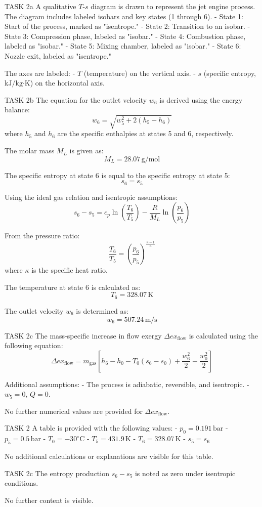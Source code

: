 TASK 2a  
A qualitative \( T \)-\( s \) diagram is drawn to represent the jet engine process. The diagram includes labeled isobars and key states (1 through 6).  
- State 1: Start of the process, marked as "isentrope."  
- State 2: Transition to an isobar.  
- State 3: Compression phase, labeled as "isobar."  
- State 4: Combustion phase, labeled as "isobar."  
- State 5: Mixing chamber, labeled as "isobar."  
- State 6: Nozzle exit, labeled as "isentrope."  

The axes are labeled:  
- \( T \) (temperature) on the vertical axis.  
- \( s \) (specific entropy, \( \text{kJ/kg·K} \)) on the horizontal axis.  

TASK 2b  
The equation for the outlet velocity \( w_6 \) is derived using the energy balance:  
\[
w_6 = \sqrt{w_5^2 + 2(h_5 - h_6)}
\]  
where \( h_5 \) and \( h_6 \) are the specific enthalpies at states 5 and 6, respectively.  

The molar mass \( M_L \) is given as:  
\[
M_L = 28.07 \, \text{g/mol}
\]  

The specific entropy at state 6 is equal to the specific entropy at state 5:  
\[
s_6 = s_5
\]  

Using the ideal gas relation and isentropic assumptions:  
\[
s_6 - s_5 = c_p \ln \left( \frac{T_6}{T_5} \right) - \frac{R}{M_L} \ln \left( \frac{p_6}{p_5} \right)
\]  

From the pressure ratio:  
\[
\frac{T_6}{T_5} = \left( \frac{p_6}{p_5} \right)^{\frac{\kappa - 1}{\kappa}}
\]  
where \( \kappa \) is the specific heat ratio.  

The temperature at state 6 is calculated as:  
\[
T_6 = 328.07 \, \text{K}
\]  

The outlet velocity \( w_6 \) is determined as:  
\[
w_6 = 507.24 \, \text{m/s}
\]  

TASK 2c  
The mass-specific increase in flow exergy \( \Delta ex_{\text{flow}} \) is calculated using the following equation:  
\[
\Delta ex_{\text{flow}} = m_{\text{gas}} \left[ h_6 - h_0 - T_0 (s_6 - s_0) + \frac{w_6^2}{2} - \frac{w_0^2}{2} \right]
\]  

Additional assumptions:  
- The process is adiabatic, reversible, and isentropic.  
- \( w_5 = 0 \), \( Q = 0 \).  

No further numerical values are provided for \( \Delta ex_{\text{flow}} \).  

TASK 2  
A table is provided with the following values:  
- \( p_0 = 0.191 \, \text{bar} \)  
- \( p_5 = 0.5 \, \text{bar} \)  
- \( T_0 = -30^\circ\text{C} \)  
- \( T_5 = 431.9 \, \text{K} \)  
- \( T_6 = 328.07 \, \text{K} \)  
- \( s_5 = s_6 \)  

No additional calculations or explanations are visible for this table.  

TASK 2c  
The entropy production \( s_6 - s_5 \) is noted as zero under isentropic conditions.  

No further content is visible.